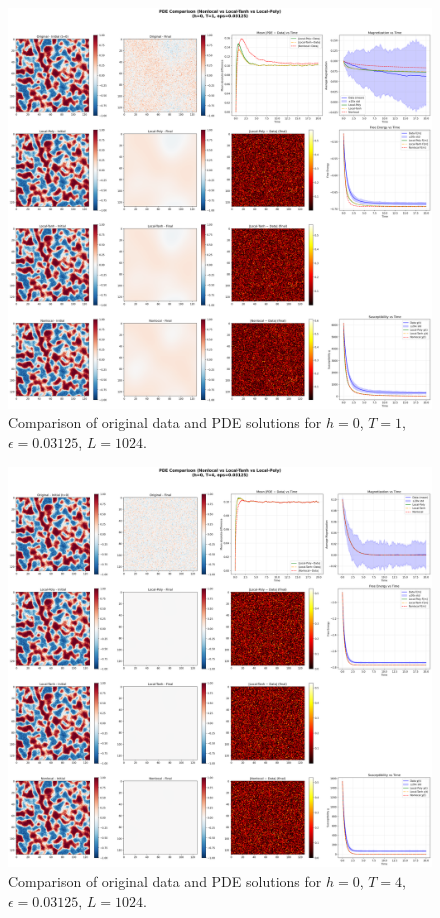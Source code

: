 \documentclass[11pt,a4paper]{article}
\begin{document}

\begin{figure}[!h]
    \centering
    \includegraphics[width=1.0\textwidth]{fig/compare_pde_solvers_L1024_h0_T1_eps0.03125.png}
    \caption{Comparison of original data and PDE solutions for $h=0$, $T=1$, $\epsilon=0.03125$, $L=1024$.}
    \label{fig:pde_comparison_h0_T1_eps0.03125}
\end{figure}


\begin{figure}[h]
    \centering
    \includegraphics[width=1.0\textwidth]{fig/compare_pde_solvers_L1024_h0_T4_eps0.03125.png}
    \caption{Comparison of original data and PDE solutions for $h=0$, $T=4$, $\epsilon=0.03125$, $L=1024$.}
    \label{fig:pde_comparison_h0_T4_eps0.03125}
\end{figure}
\end{document}
